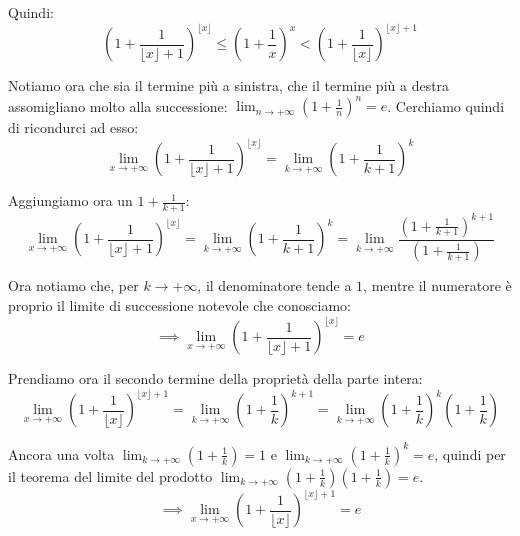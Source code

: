 \documentclass{article}
\begin{document}
\noindent Quindi:
\begin{equation*}
      \left(1 + \frac{1}{\lfloor x \rfloor + 1}\right)^{\lfloor x \rfloor} \leq \left(1 + \frac{1}{x}\right)^x < \left(1 + \frac{1}{\lfloor x \rfloor}\right)^{\lfloor x \rfloor + 1}
\end{equation*}

\noindent Notiamo ora che sia il termine più a sinistra, che il termine più a destra assomigliano molto alla successione: $\lim_{n \to +\infty} (1 + \frac{1}{n})^n = e$. Cerchiamo quindi di ricondurci ad esso:
\begin{equation*}
    \lim_{x \to +\infty} \left(1 + \frac{1}{\lfloor x \rfloor + 1}\right)^{\lfloor x \rfloor} = \lim_{k \to +\infty} \left(1 + \frac{1}{k + 1}\right)^k
\end{equation*}

\noindent Aggiungiamo ora un $1 + \frac{1}{k + 1}$:
\begin{equation*}
    \lim_{x \to +\infty} \left(1 + \frac{1}{\lfloor x \rfloor + 1}\right)^{\lfloor x \rfloor} = \lim_{k \to +\infty} \left(1 + \frac{1}{k + 1}\right)^k = \lim_{k \to +\infty} \frac{\left(1 + \frac{1}{k + 1}\right)^{k + 1}}{\left(1 + \frac{1}{k + 1}\right)}
\end{equation*}

\noindent Ora notiamo che, per $k \to +\infty$, il denominatore tende a $1$, mentre il numeratore è proprio il limite di successione notevole che conosciamo:
\begin{equation*}
    \implies \lim_{x \to +\infty} \left(1 + \frac{1}{\lfloor x \rfloor + 1}\right)^{\lfloor x \rfloor} = e
\end{equation*}

\noindent Prendiamo ora il secondo termine della proprietà della parte intera:
\begin{equation*}
    \lim_{x \to +\infty} \left(1 + \frac{1}{\lfloor x \rfloor}\right)^{\lfloor x \rfloor + 1} = \lim_{k \to +\infty} \left(1 + \frac{1}{k}\right)^{k + 1} = \lim_{k \to +\infty} \left(1 + \frac{1}{k}\right)^k \left(1 + \frac{1}{k}\right)
\end{equation*}

\noindent Ancora una volta $\lim_{k \to +\infty} \left(1 + \frac{1}{k}\right) = 1$ e $\lim_{k \to +\infty} \left(1 + \frac{1}{k}\right)^k = e$, quindi per il teorema del limite del prodotto $\lim_{k \to +\infty} \left(1 + \frac{1}{k}\right) \left(1 + \frac{1}{k}\right) = e$.
\begin{equation*}
    \implies \lim_{x \to +\infty} \left(1 + \frac{1}{\lfloor x \rfloor}\right)^{\lfloor x \rfloor + 1} = e
\end{equation*}
\end{document}

